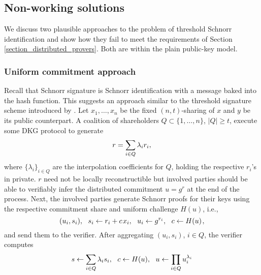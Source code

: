 \documentclass{iacrtrans}
\begin{document}
\subsection{Non-working solutions}\label{section_non_working_solutions}

We discuss two plausible approaches to the
problem of threshold Schnorr identification
and show how they fail to meet
the requirements of
Section \ref{section_distributed_provers}.
Both are within the plain public-key model.

\subsubsection{Uniform commitment approach}\label{section_uniform_commitment}

Recall that Schnorr signature is
Schnorr identification with a message baked
into the hash function.
This suggests an approach similar to the
threshold signature scheme introduced
by \cite{paper_stinson_strobl}.
Let $x_1, \dots, x_n$ be the fixed
$(n,t)$-sharing of $x$ and $y$ be its public counterpart.
A coalition of shareholders $Q \subset \{1, \dots, n\}$,
$|Q| \ge t$, execute some DKG protocol to generate
\vspace{5pt}
\begin{equation*}
r = \sum_{i \in Q} \lambda_i r_i,
\vspace{5pt}
\end{equation*}
where $\{\lambda_i\}_{i \in Q}$
are the interpolation coefficients
for $Q$, holding the respective $r_i$'s in private.
$r$ need not be locally reconstructible
but involved parties should be able to
verifiably infer the distributed commitment
$u = g^r$ at the end of the process.
Next, the involved parties generate Schnorr proofs
for their keys using the respective commitment share
and uniform challenge $H(u)$, i.e.,
\vspace{5pt}
\begin{equation*}
(u_i, s_i),
\ \ s_i \leftarrow r_i + c\hspace{1pt}x_i,
\ \ u_i \leftarrow g ^ {r_i},
\ \ c \leftarrow H(u)
\hspace{1pt},
\vspace{5pt}
\end{equation*}
and send them to the verifier. 
After aggregating $(u_i, s_i)$, $i \in Q$,
the verifier computes
\vspace{5pt}
\begin{equation*}
s \leftarrow \sum_{i \in Q} \lambda_i s_i,
\ \ c \leftarrow H(u),
\ \ u \leftarrow \prod_{i \in Q} u_i ^ {\lambda_i}
\vspace{5pt}
\end{equation*}
\end{document}
